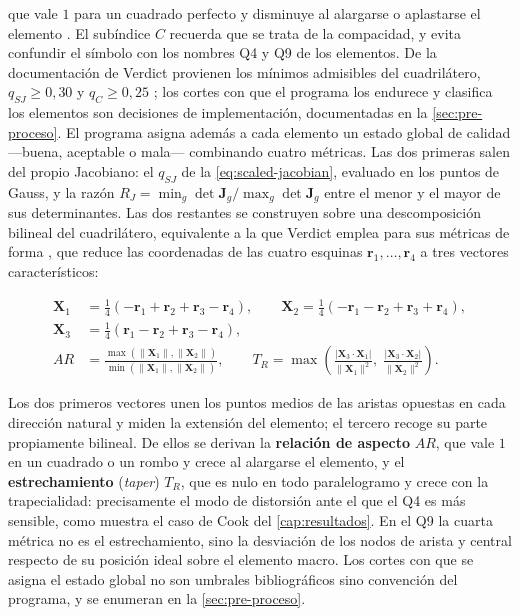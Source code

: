 que vale $1$ para un cuadrado perfecto y disminuye al alargarse o aplastarse el elemento \autocite[p.~57]{stimpson2007verdict}. El subíndice $C$ recuerda que se trata de la compacidad, y evita confundir el símbolo con los nombres Q4 y Q9 de los elementos. De la documentación de Verdict provienen los mínimos admisibles del cuadrilátero, $q_{SJ} \ge 0{,}30$ y $q_C \ge 0{,}25$ \autocite[pp.~51, 57]{stimpson2007verdict}; los cortes con que el programa los endurece y clasifica los elementos son decisiones de implementación, documentadas en la \autoref{sec:pre-proceso}. El programa asigna además a cada elemento un estado global de calidad —buena, aceptable o mala— combinando cuatro métricas. Las dos primeras salen del propio Jacobiano: el $q_{SJ}$ de la \autoref{eq:scaled-jacobian}, evaluado en los puntos de Gauss, y la razón $R_J = \min_g \det\bm{J}_g / \max_g \det\bm{J}_g$ entre el menor y el mayor de sus determinantes. Las dos restantes se construyen sobre una descomposición bilineal del cuadrilátero, equivalente a la que Verdict emplea para sus métricas de forma \autocite[pp.~35-36]{stimpson2007verdict}, que reduce las coordenadas de las cuatro esquinas $\bm{r}_1,\dots,\bm{r}_4$ a tres vectores característicos:

\begin{equation}
\begin{aligned}
\bm{X}_1 &= \tfrac{1}{4}\left(-\bm{r}_1 + \bm{r}_2 + \bm{r}_3 - \bm{r}_4\right), \qquad
\bm{X}_2 = \tfrac{1}{4}\left(-\bm{r}_1 - \bm{r}_2 + \bm{r}_3 + \bm{r}_4\right), \\[2pt]
\bm{X}_3 &= \tfrac{1}{4}\left(\bm{r}_1 - \bm{r}_2 + \bm{r}_3 - \bm{r}_4\right), \\[4pt]
AR &= \frac{\max(\|\bm{X}_1\|, \|\bm{X}_2\|)}{\min(\|\bm{X}_1\|, \|\bm{X}_2\|)}, \qquad
T_R = \max\left(\frac{|\bm{X}_3 \cdot \bm{X}_1|}{\|\bm{X}_1\|^2},\; \frac{|\bm{X}_3 \cdot \bm{X}_2|}{\|\bm{X}_2\|^2}\right).
\end{aligned}
\label{eq:descomposicion-bilineal}
\end{equation}

Los dos primeros vectores unen los puntos medios de las aristas opuestas en cada dirección natural y miden la extensión del elemento; el tercero recoge su parte propiamente bilineal. De ellos se derivan la \textbf{relación de aspecto} $AR$, que vale $1$ en un cuadrado o un rombo y crece al alargarse el elemento, y el \textbf{estrechamiento} (\emph{taper}) $T_R$, que es nulo en todo paralelogramo y crece con la trapecialidad: precisamente el modo de distorsión ante el que el Q4 es más sensible, como muestra el caso de Cook del \autoref{cap:resultados}. En el Q9 la cuarta métrica no es el estrechamiento, sino la desviación de los nodos de arista y central respecto de su posición ideal sobre el elemento macro. Los cortes con que se asigna el estado global no son umbrales bibliográficos sino convención del programa, y se enumeran en la \autoref{sec:pre-proceso}.

